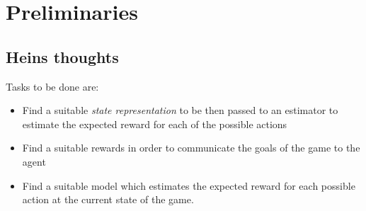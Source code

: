 \documentclass[12pt]{report}
\begin{document}

\tableofcontents
\pagebreak

\renewcommand{\thesection}{\arabic{section}}
\chapter{Preliminaries}
\section{Heins thoughts}
Tasks to be done are:
	\begin{itemize}
		\item Find a suitable \textit{state representation} to be then passed to an estimator to estimate the expected reward for each of the possible actions
		\item Find a suitable rewards in order to communicate the goals of the game to the agent
		\item Find a suitable model which estimates the expected reward for each possible action at the current state of the game.
	\end{itemize}
\end{document}
